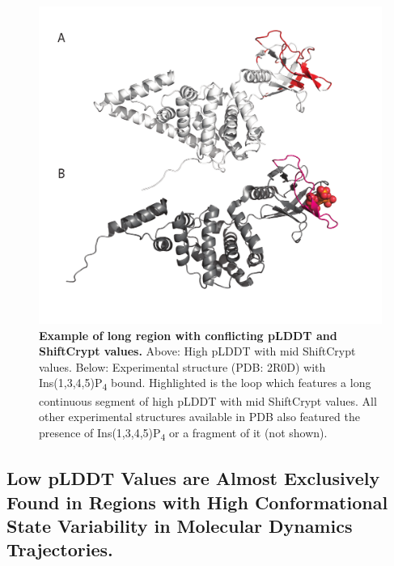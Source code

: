 \begin{figure}[htb!]
    \centering
    \includegraphics[width=\textwidth]{pLDDT/plddt_figures/allosterism_and_shiftcrypt.pdf}
    \caption{\textbf{Example of long region with conflicting pLDDT and ShiftCrypt values.} 
    Above: High pLDDT with mid ShiftCrypt values. Below: Experimental structure (PDB: 2R0D) with Ins(1,3,4,5)P\textsubscript{4} bound. Highlighted is the loop which features a long continuous segment of high pLDDT with mid ShiftCrypt values. All other experimental structures available in PDB also featured the presence of Ins(1,3,4,5)P\textsubscript{4} or a fragment of it (not shown).}
\label{fig:shiftcrypt_and_allosterism}
\end{figure}

\subsection{Low pLDDT Values are Almost Exclusively Found in Regions with High Conformational State Variability in Molecular Dynamics Trajectories.}


